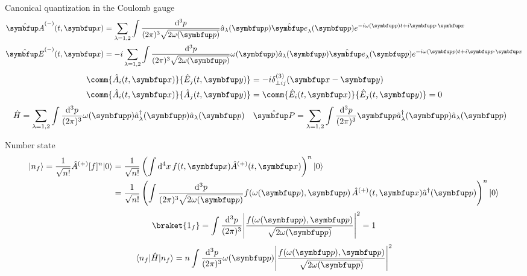 \documentclass[aspectratio=169,usenames,dvipsnames]{beamer}
\begin{document}
	\begin{frame}{Canonical quantization in the Coulomb gauge}
		\begin{align}
			\vu{A}^{(-)}(t,\vb{x})
			&=
			\sum_{\lambda=1,2}
			\int\frac{\dd[3]{p}}{(2\pi)^3\sqrt{2\omega(\vb{p})}}
			\hat{a}_\lambda(\vb{p})
			\vu{e}_\lambda(\vb{p})
			e^{-i\omega(\vb{p})t+i\vb{p}\vdot\vb{x}}
			\\
			\vu{E}^{(-)}(t,\vb{x})
			&=
			-i
			\sum_{\lambda=1,2}
			\int\frac{\dd[3]{p}}{(2\pi)^3\sqrt{2\omega(\vb{p})}}
			\omega(\vb{p})
			\hat{a}_\lambda(\vb{p})
			\vu{e}_\lambda(\vb{p})
			e^{-i\omega(\vb{p})t+i\vb{p}\vdot\vb{x}}
		\end{align}
		\begin{align}
			\comm{\hat{A}_i(t,\vb{x})}{\hat{E}_j(t,\vb{y})}
			&=
			-i\delta_{\perp ij}^{(3)}(\vb{x}-\vb{y})
			\\
			\comm{\hat{A}_i(t,\vb{x})}{\hat{A}_j(t,\vb{y})}
			&=
			\comm{\hat{E}_i(t,\vb{x})}{\hat{E}_j(t,\vb{y})}
			=
			0
		\end{align}
		\begin{align}
			\hat{H}
			&=
			\sum_{\lambda=1,2}
			\int\frac{\dd[3]{p}}{(2\pi)^3}
			\omega(\vb{p})
			\hat{a}_\lambda^\dagger(\vb{p})
			\hat{a}_\lambda(\vb{p})
			&
			\vu{P}
			&=
			\sum_{\lambda=1,2}
			\int\frac{\dd[3]{p}}{(2\pi)^3}
			\vb{p}
			\hat{a}_\lambda^\dagger(\vb{p})
			\hat{a}_\lambda(\vb{p})
		\end{align}
	\end{frame}
	
	\begin{frame}{Number state}
		\begin{equation}
			\begin{split}
				\ket{n_f}
				=
				\frac{1}{\sqrt{n!}}
				\hat{A}^{(+)}[f]^n
				\ket{0}
				&=
				\frac{1}{\sqrt{n!}}
				\left(
					\int\dd[4]{x}
					f(t,\vb{x})
					\hat{A}^{(+)}(t,\vb{x})
				\right)^n
				\ket{0}
				\\
				&=
				\frac{1}{\sqrt{n!}}
				\left(
					\int\frac{\dd[3]{p}}{(2\pi)^3\sqrt{2\omega(\vb{p})}}
					f\!\left(\omega(\vb{p}),\vb{p}\right)
					\hat{A}^{(+)}(t,\vb{x})
					\hat{a}^\dagger(\vb{p})
				\right)^n
				\ket{0}
			\end{split}
		\end{equation}
		\begin{equation}
			\braket{1_f}
			=
			\int\frac{\dd[3]{p}}{(2\pi)^3}
			\abs*{\frac{f\!\left(\omega(\vb{p}),\vb{p}\right)}{\sqrt{2\omega(\vb{p})}}}^2
			=
			1
		\end{equation}
		\begin{equation}
			\bra{n_f}
			\hat{H}
			\ket{n_f}
			=
			n
			\int\frac{\dd[3]{p}}{(2\pi)^3}
			\omega(\vb{p})
			\abs*{\frac{f\!\left(\omega(\vb{p}),\vb{p}\right)}{\sqrt{2\omega(\vb{p})}}}^2
		\end{equation}
	\end{frame}
\end{document}
